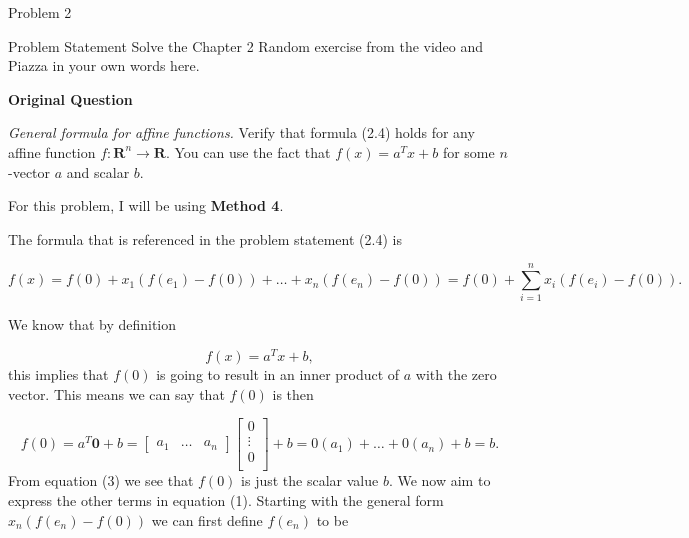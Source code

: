 \begin{problem}{Problem 2}
    \begin{statement}{Problem Statement}
        Solve the Chapter 2 Random exercise from the video and Piazza in your own words here. \vspace*{1em}

        \textbf{Original Question} \vspace*{1em}

        \textit{General formula for affine functions.} Verify that formula (2.4) holds for any affine function $f:\mathbf{R}^{n}\rightarrow\mathbf{R}$. You can use the fact that $f(x) = a^{T}x + b$ for some $n$-vector $a$ 
        and scalar $b$.
    \end{statement}

    \begin{Highlight}[Solution]
        For this problem, I will be using \textbf{Method 4}. \vspace*{1em}

        The formula that is referenced in the problem statement (2.4) is 

        \setcounter{equation}{0}
        \begin{equation}
            f(x) = f(0) + x_{1}(f(e_{1}) - f(0)) + \dots + x_{n}(f(e_{n}) - f(0)) = f(0) + \sum^{n}_{i = 1} x_{i}(f(e_{i}) - f(0)).
        \end{equation}

        We know that by definition 

        \begin{equation}
            f(x) = a^{T}x + b,
        \end{equation}
        this implies that $f(0)$ is going to result in an inner product of $a$ with the zero vector. This means we can say that $f(0)$ is then

        \begin{equation}
            f(0) = a^{T}\mathbf{0} + b = 
            \begin{bmatrix}
                a_{1} & \dots & a_{n}
            \end{bmatrix}
            \begin{bmatrix}
                0 \\
                \vdots \\
                0 \\
            \end{bmatrix}
            + b = 0(a_{1}) + \dots + 0(a_{n}) + b = b.
        \end{equation}
        From equation (3) we see that $f(0)$ is just the scalar value $b$. We now aim to express the other terms in equation (1). Starting with the general form $x_{n}(f(e_{n}) - f(0))$ we can first
        define $f(e_{n})$ to be


\end{Highlight}
\end{problem}
